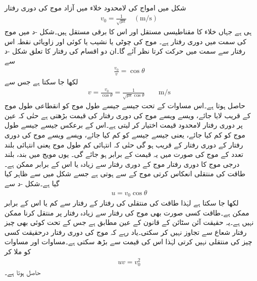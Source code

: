 شکل  میں  امواج کی   لامحدود خلاء میں آزاد موج کی دوری رفتار
\begin{align}
v_0=\frac{1}{\sqrt{\mu \epsilon}} \quad (\si{\meter \per \second})
\end{align}
ہی ہے جہاں خلاء کا مقناطیسی مستقل  اور اس کا برقی مستقل  ہیں۔شکل -د میں  موج کی  سمت میں دوری رفتار  ہے۔ موج کی چوٹی یا نشیب یا کوئی اور زاویائی نقطہ اس رفتار سے  سمت میں حرکت کرتا نظر آئے گا۔ان دو اقسام کی رفتار کا تعلق شکل -د سے
\begin{align}
\frac{v_0}{v}=\cos \theta
\end{align}
لکھا جا سکتا ہے جس سے
\begin{align}\label{مساوات_مویج_دوری_رفتار_تعلق_الف}
v=\frac{v_0}{\cos \theta}=\frac{1}{\sqrt{\mu \epsilon} \cos \theta} \quad \quad \si{\meter\per\second}
\end{align}
حاصل ہوتا ہے۔اس مساوات کے تحت جیسے جیسے طول موج کو انقطاعی طول موج کے قریب لایا جائے، ویسے ویسے  موج کی دوری رفتار کی قیمت بڑھتی ہے حتٰی کہ عین  پر دوری رفتار لامحدود قیمت اختیار کر لیتی ہے۔اس کے برعکس جیسے جیسے طول موج کو کم کیا جائے، یعنی جیسے جیسے  کو کم کیا جائے، ویسے ویسے  موج کی دوری رفتار  کے دوری رفتار کے قریب ہو گی حتٰی کہ انتہائی کم طول موج یعنی انتہائی بلند تعدد کے موج کی صورت میں یہ قیمت  کے برابر ہو جائے گی۔ یوں مویج میں بند، بلند درجی موج کا دوری رفتار  موج کے دوری رفتار سے زیادہ یا اس کے برابر ممکن ہے۔طاقت کی منتقلی انعکاس کرتی موج کے  سے ہوتی ہے جسے شکل میں  سے ظاہر کیا گیا ہے۔شکل -د سے
\begin{align}\label{مساوات_مویج_دوری_رفتار_تعلق_ب}
u=v_0 \cos \theta
\end{align}
لکھا جا سکتا ہے لہٰذا طاقت کی منتقلی کی رفتار  کے رفتار سے کم یا اس کے برابر ممکن ہے۔طاقت کسی صورت بھی  موج کی رفتار سے زیادہ رفتار پر منتقل کرنا ممکن نہیں ہے۔یہ حقیقت آئن سٹائن کے قانون کے عین مطابق ہے جس کے تحت کوئی بھی چیز رفتار شعاع سے تجاوز نہیں کر سکتی۔یاد رہے کہ  موج کی دوری رفتار درحقیقت کسی چیز کی منتقلی نہیں کرتی لہٰذا اس کی قیمت  سے بڑھ سکتی ہے۔مساوات  اور مساوات   کو ملا کر 
\begin{align}\label{مساوات_مویج_دوری_رفتار_تعلق_پ}
u v =v_0^2
\end{align}
حاصل ہوتا ہے۔

